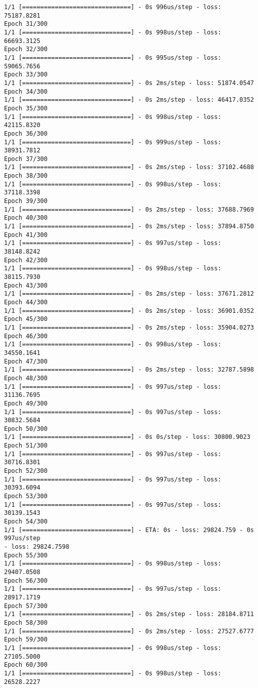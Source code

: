\documentclass[11pt]{article}
\begin{document}
\begin{Verbatim}[commandchars=\\\{\}]
1/1 [==============================] - 0s 996us/step - loss: 75187.8281
Epoch 31/300
1/1 [==============================] - 0s 998us/step - loss: 66693.3125
Epoch 32/300
1/1 [==============================] - 0s 995us/step - loss: 59065.7656
Epoch 33/300
1/1 [==============================] - 0s 2ms/step - loss: 51874.0547
Epoch 34/300
1/1 [==============================] - 0s 2ms/step - loss: 46417.0352
Epoch 35/300
1/1 [==============================] - 0s 998us/step - loss: 42115.8320
Epoch 36/300
1/1 [==============================] - 0s 999us/step - loss: 38931.7812
Epoch 37/300
1/1 [==============================] - 0s 2ms/step - loss: 37102.4688
Epoch 38/300
1/1 [==============================] - 0s 998us/step - loss: 37118.3398
Epoch 39/300
1/1 [==============================] - 0s 2ms/step - loss: 37688.7969
Epoch 40/300
1/1 [==============================] - 0s 2ms/step - loss: 37894.8750
Epoch 41/300
1/1 [==============================] - 0s 997us/step - loss: 38148.8242
Epoch 42/300
1/1 [==============================] - 0s 998us/step - loss: 38115.7930
Epoch 43/300
1/1 [==============================] - 0s 2ms/step - loss: 37671.2812
Epoch 44/300
1/1 [==============================] - 0s 2ms/step - loss: 36901.0352
Epoch 45/300
1/1 [==============================] - 0s 2ms/step - loss: 35904.0273
Epoch 46/300
1/1 [==============================] - 0s 998us/step - loss: 34550.1641
Epoch 47/300
1/1 [==============================] - 0s 2ms/step - loss: 32787.5898
Epoch 48/300
1/1 [==============================] - 0s 997us/step - loss: 31136.7695
Epoch 49/300
1/1 [==============================] - 0s 997us/step - loss: 30832.5684
Epoch 50/300
1/1 [==============================] - 0s 0s/step - loss: 30800.9023
Epoch 51/300
1/1 [==============================] - 0s 997us/step - loss: 30716.8301
Epoch 52/300
1/1 [==============================] - 0s 997us/step - loss: 30393.6094
Epoch 53/300
1/1 [==============================] - 0s 997us/step - loss: 30139.1543
Epoch 54/300
1/1 [==============================] - ETA: 0s - loss: 29824.759 - 0s 997us/step
- loss: 29824.7598
Epoch 55/300
1/1 [==============================] - 0s 998us/step - loss: 29407.0508
Epoch 56/300
1/1 [==============================] - 0s 997us/step - loss: 28917.1719
Epoch 57/300
1/1 [==============================] - 0s 2ms/step - loss: 28184.8711
Epoch 58/300
1/1 [==============================] - 0s 2ms/step - loss: 27527.6777
Epoch 59/300
1/1 [==============================] - 0s 998us/step - loss: 27105.5000
Epoch 60/300
1/1 [==============================] - 0s 998us/step - loss: 26528.2227

\end{Verbatim}
\end{document}
